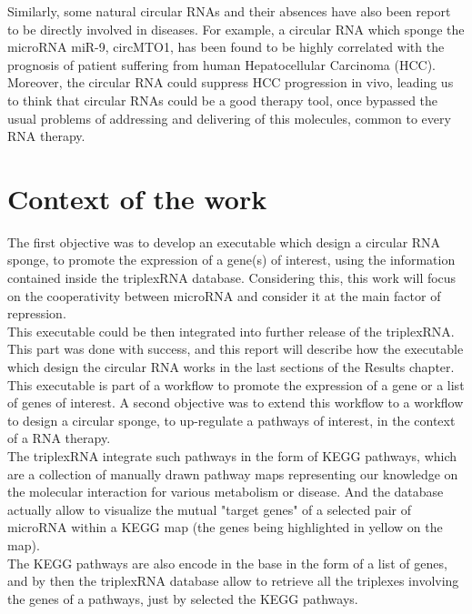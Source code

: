 \documentclass[a4paper,12pt]{report}
\begin{document}
Similarly, some natural circular RNAs and their absences have also been report to be directly involved in diseases. For example, a circular RNA which sponge the microRNA miR-9, circMTO1, has been found to be highly  correlated with the prognosis of patient suffering from human Hepatocellular Carcinoma (HCC)\cite{carcinoma}.\\

Moreover, the circular RNA could suppress HCC progression in vivo\cite{carcinoma}, leading us to think that circular RNAs could be a good therapy tool, once bypassed the usual problems of addressing and delivering of this molecules, common to every RNA therapy\cite{therapeutics}.

\section{Context of the work}

The first objective was to develop an executable which design a circular RNA sponge, to promote the expression of a gene(s) of interest, using the information contained inside the triplexRNA database. Considering this, this work will focus on the cooperativity between microRNA and consider it at the main factor of repression.\\ 

This executable could be then integrated into further release of the triplexRNA. This part was done with success, and this report will describe how the executable which design the circular RNA works in the last sections of the Results chapter.\\

This executable is part of a workflow to promote the expression of a gene or a list of genes of interest. A second objective was to extend this workflow to a workflow to design a circular sponge, to up-regulate a pathways of interest, in the context of a RNA therapy.\\

The triplexRNA integrate such pathways in the form of KEGG pathways, which are a collection of manually drawn pathway maps representing our knowledge on the molecular interaction for various metabolism or disease\cite{KEGG}. And the database actually allow to visualize the mutual "target genes" of a selected pair of microRNA within a KEGG map (the genes being highlighted in yellow on the map).\\

The KEGG pathways are also encode in the base in the form of a list of genes, and by then the triplexRNA database allow to retrieve all the triplexes involving the genes of a pathways, just by selected the KEGG pathways.\\
\end{document}
